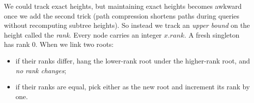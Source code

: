 We could track exact heights, but maintaining exact heights becomes awkward
once we add the second trick (path compression shortens paths during queries
without recomputing subtree heights). So instead we track an \emph{upper bound} on the
height called the \emph{rank}. Every node carries an integer $x.\textit{rank}$.
A fresh singleton has rank $0$. When we link two roots:

\begin{itemize}
  \item if their ranks differ, hang the lower-rank root under the higher-rank
        root, and \emph{no rank changes};
  \item if their ranks are equal, pick either as the new root and increment its
        rank by one.
\end{itemize}

\begin{algorithm}[H]
\caption{Forest with union by rank}
\end{algorithm}

